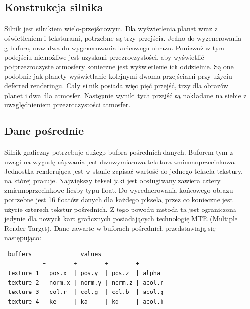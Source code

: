 
\subsection{Konstrukcja silnika}\label{sub:konstrukcja silnika}
\paragraph{}

Silnik jest silnikiem wielo-przejściowym. Dla wyświetlenia planet wraz z oświetleniem i teksturami, potrzebne są trzy przejścia. Jedno do wygenerowania g-bufora, oraz dwa do wygenerowania końcowego obrazu. Ponieważ w tym podejściu niemożliwe jest uzyskani przezroczystości, aby wyświetlić półprzezroczyste atmosfery konieczne jest wyświetlenie ich oddzielnie. Są one podobnie jak planety wyświetlanie kolejnymi dwoma przejściami przy użyciu deferred renderingu. Cały silnik posiada więc pięć przejść, trzy dla obrazów planet i dwa dla atmosfer. Następnie wyniki tych przejść są nakładane na siebie z uwzględnieniem przezroczystości atmosfer.

\subsection{Dane pośrednie}\label{sub:dane pośrednie}
\paragraph{}

Silnik graficzny potrzebuje dużego bufora pośrednich danych. Buforem tym z uwagi na wygodę używania jest dwuwymiarowa tekstura zmiennoprzecinkowa. Jednostka renderująca jest w stanie zapisać wartość do jednego teksela tekstury, na której pracuje. Największy teksel jaki jest obsługiwany zawiera cztery zmiennoprzecinkowe liczby typu float. Do wyrednerowania końcowego obrazu potrzebne jest 16 floatów danych dla każdego piksela, przez co konieczne jest użycie czterech tekstur pośrednich. Z tego powodu metoda ta jest ograniczona jedynie dla nowych kart graficznych posiadających technologię MTR (Multiple Render Target). Dane zawarte w buforach pośrednich przedstawiają się następująco:

\begin{verbatim}
 buffers   |          values 
-----------+--------+--------+--------+----------
 texture 1 | pos.x  | pos.y  | pos.z  | alpha
 texture 2 | norm.x | norm.y | norm.z | acol.r
 texture 3 | col.r  | col.g  | col.b  | acol.g   
 texture 4 | ke     | ka     | kd     | acol.b
\end{verbatim}

